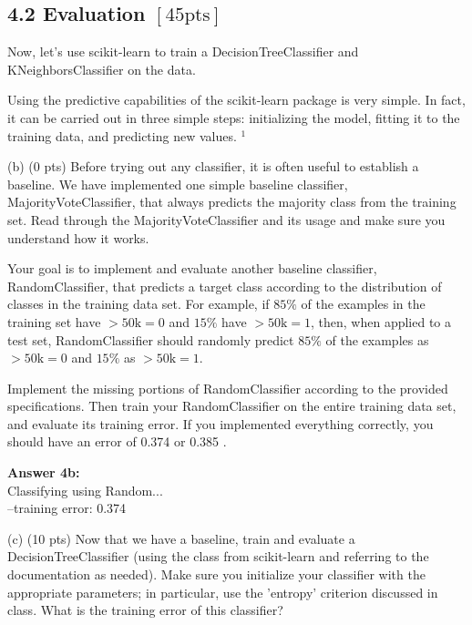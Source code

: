\documentclass[10pt]{article}
\begin{document}
\subsection*{4.2 Evaluation $[45 \mathrm{pts}]$}

Now, let's use scikit-learn to train a DecisionTreeClassifier and KNeighborsClassifier on the data.

Using the predictive capabilities of the scikit-learn package is very simple. In fact, it can be carried out in three simple steps: initializing the model, fitting it to the training data, and predicting new values. ${ }^{1}$

(b) (0 pts) Before trying out any classifier, it is often useful to establish a baseline. We have implemented one simple baseline classifier, MajorityVoteClassifier, that always predicts the majority class from the training set. Read through the MajorityVoteClassifier and its usage and make sure you understand how it works.

Your goal is to implement and evaluate another baseline classifier, RandomClassifier, that predicts a target class according to the distribution of classes in the training data set. For example, if $85 \%$ of the examples in the training set have $>50 \mathrm{k}=0$ and $15 \%$ have $>50 \mathrm{k}=1$, then, when applied to a test set, RandomClassifier should randomly predict $85 \%$ of the examples as $>50 \mathrm{k}=0$ and $15 \%$ as $>50 \mathrm{k}=1$.

Implement the missing portions of RandomClassifier according to the provided specifications. Then train your RandomClassifier on the entire training data set, and evaluate its training error. If you implemented everything correctly, you should have an error of 0.374 or 0.385 .

\hspace{1 cm}

\begin{flushleft}

\textbf{Answer 4b:} \\
Classifying using Random... \\
	--training error: 0.374 \\

    
\end{flushleft}

(c) (10 pts) Now that we have a baseline, train and evaluate a DecisionTreeClassifier (using the class from scikit-learn and referring to the documentation as needed). Make sure you initialize your classifier with the appropriate parameters; in particular, use the 'entropy' criterion discussed in class. What is the training error of this classifier?
\end{document}
